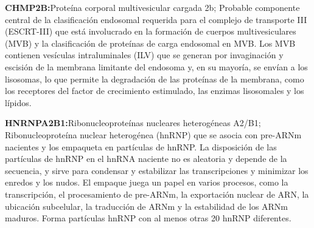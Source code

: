 \hfill

\textbf{CHMP2B\cite{CHMP2B}:}Proteína corporal multivesicular cargada 2b; Probable componente central de la clasificación endosomal requerida para el complejo de transporte III (ESCRT-III) que está involucrado en la formación de cuerpos multivesiculares (MVB) y la clasificación de proteínas de carga endosomal en MVB. Los MVB contienen vesículas intraluminales (ILV) que se generan por invaginación y escisión de la membrana limitante del endosoma y, en su mayoría, se envían a los lisosomas, lo que permite la degradación de las proteínas de la membrana, como los receptores del factor de crecimiento estimulado, las enzimas lisosomales y los lípidos.

\hfill

\textbf{HNRNPA2B1\cite{HNRNPA2B1}:}Ribonucleoproteínas nucleares heterogéneas A2/B1; Ribonucleoproteína nuclear heterogénea (hnRNP) que se asocia con pre-ARNm nacientes y los empaqueta en partículas de hnRNP. La disposición de las partículas de hnRNP en el hnRNA naciente no es aleatoria y depende de la secuencia, y sirve para condensar y estabilizar las transcripciones y minimizar los enredos y los nudos. El empaque juega un papel en varios procesos, como la transcripción, el procesamiento de pre-ARNm, la exportación nuclear de ARN, la ubicación subcelular, la traducción de ARNm y la estabilidad de los ARNm maduros. Forma partículas hnRNP con al menos otras 20 hnRNP diferentes.

\newpage